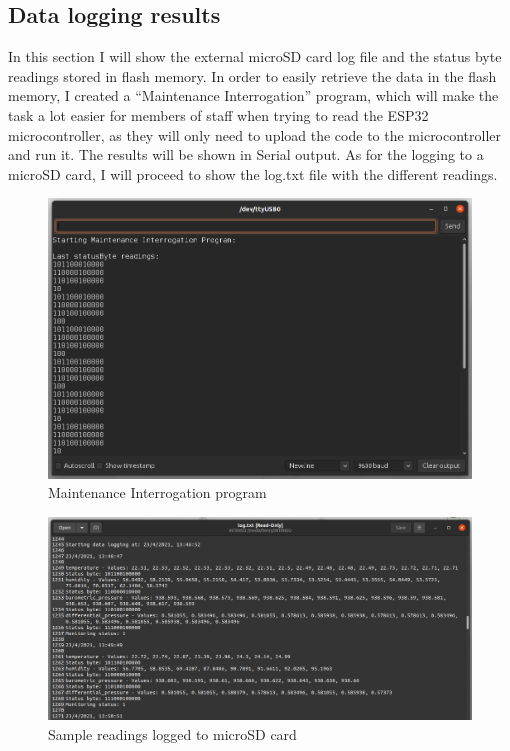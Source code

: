 \documentclass[12pt]{article}
\begin{document}
\subsection{Data logging results}

In this section I will show the external microSD card log file and the status byte readings stored in flash memory. In order to easily retrieve the data in the flash memory, I created a ``Maintenance Interrogation'' program, which will make the task a lot easier for members of staff when trying to read the ESP32 microcontroller, as they will only need to upload the code to the microcontroller and run it. The results will be shown in Serial output. As for the logging to a microSD card, I will proceed to show the log.txt file with the different readings.

\begin{figure}[h]
\includegraphics[scale=0.35]{maintenance-interrogation}
\centering
\caption{Maintenance Interrogation program}
\label{fig:maintenance}
\end{figure}

\begin{figure}[h]
\includegraphics[scale=0.35]{log}
\centering
\caption{Sample readings logged to microSD card}
\label{fig:log}
\end{figure}
\end{document}
